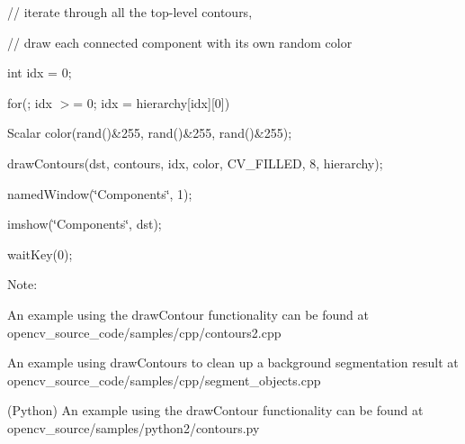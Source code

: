 {\ttfamily }

{\ttfamily }

{\ttfamily // iterate through all the top-\/level contours,}

{\ttfamily }

{\ttfamily }

{\ttfamily // draw each connected component with its own random color}

{\ttfamily }

{\ttfamily }

{\ttfamily int idx = 0;}

{\ttfamily }

{\ttfamily }

{\ttfamily for(; idx $>$= 0; idx = hierarchy\mbox{[}idx\mbox{]}\mbox{[}0\mbox{]})}

{\ttfamily }

{\ttfamily }

{\ttfamily Scalar color(rand()\&255, rand()\&255, rand()\&255);}

{\ttfamily }

{\ttfamily }

{\ttfamily draw\+Contours(dst, contours, idx, color, C\+V\+\_\+\+F\+I\+L\+L\+E\+D, 8, hierarchy);}

{\ttfamily }

{\ttfamily }

{\ttfamily named\+Window(\char`\"{}\+Components\char`\"{}, 1);}

{\ttfamily }

{\ttfamily }

{\ttfamily imshow(\char`\"{}\+Components\char`\"{}, dst);}

{\ttfamily }

{\ttfamily }

{\ttfamily wait\+Key(0);}

{\ttfamily }

{\ttfamily }

{\ttfamily Note\+: }


\begin{DoxyItemize}
\item An example using the draw\+Contour functionality can be found at opencv\+\_\+source\+\_\+code/samples/cpp/contours2.\+cpp 
\item An example using draw\+Contours to clean up a background segmentation result at opencv\+\_\+source\+\_\+code/samples/cpp/segment\+\_\+objects.\+cpp 
\item (Python) An example using the draw\+Contour functionality can be found at opencv\+\_\+source/samples/python2/contours.\+py 
\end{DoxyItemize}


